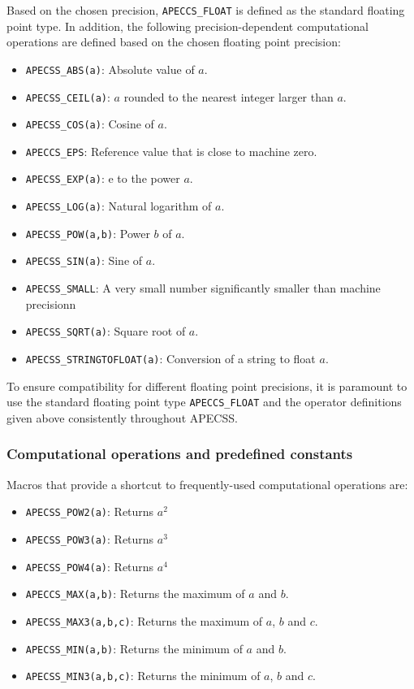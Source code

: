 Based on the chosen precision, {\tt APECCS\_FLOAT} is defined as the standard floating point type. In addition, the following precision-dependent computational operations are defined based on the chosen floating point precision:\vspace{-0.5em}
\begin{itemize}[noitemsep]
  \item {\tt APECSS\_ABS(a)}: Absolute value of $a$.
  \item {\tt APECSS\_CEIL(a)}: $a$ rounded to the nearest integer larger than $a$.
  \item {\tt APECSS\_COS(a)}: Cosine of $a$.
  \item {\tt APECCS\_EPS}: Reference value that is close to machine zero.
  \item {\tt APECSS\_EXP(a)}: $\text{e}$ to the power $a$.
  \item {\tt APECSS\_LOG(a)}: Natural logarithm of $a$.
  \item {\tt APECSS\_POW(a,b)}: Power $b$ of $a$.
  \item {\tt APECSS\_SIN(a)}: Sine of $a$.
  \item {\tt APECSS\_SMALL}: A very small number significantly smaller than machine precisionn
  \item {\tt APECSS\_SQRT(a)}: Square root of $a$.
  \item {\tt APECSS\_STRINGTOFLOAT(a)}: Conversion of a string to float $a$.
\end{itemize}
To ensure compatibility for different floating point precisions, it is paramount to use the standard floating point type {\tt APECCS\_FLOAT} and the operator definitions given above consistently throughout APECSS.

\subsubsection{Computational operations and predefined constants}

Macros that provide a shortcut to frequently-used computational operations are:\vspace{-1em}
\begin{itemize}[noitemsep]
  \item {\tt APECSS\_POW2(a)}: Returns $a^2$
  \item {\tt APECSS\_POW3(a)}: Returns $a^3$
  \item {\tt APECSS\_POW4(a)}: Returns $a^4$
  \item {\tt APECCS\_MAX(a,b)}: Returns the maximum of $a$ and $b$.
  \item {\tt APECSS\_MAX3(a,b,c)}: Returns the maximum of $a$, $b$ and $c$.
  \item {\tt APECSS\_MIN(a,b)}: Returns the minimum of $a$ and $b$.
  \item {\tt APECSS\_MIN3(a,b,c)}: Returns the minimum of $a$, $b$ and $c$.
\end{itemize}

